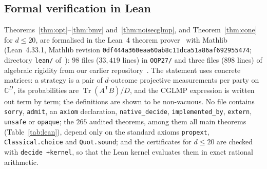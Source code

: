 \documentclass[11pt]{article}
\theoremstyle{remark}
\numberwithin{equation}{section}
\newcommand{\C}{\mathbb{C}}
\newcommand{\Tr}{\operatorname{Tr}}
\begin{document}
\subsection{Formal verification in Lean}\label{subsec:lean}
Theorems~\ref{thm:opt}--\ref{thm:bmv} and~\ref{thm:noisecglmp}, and Theorem~\ref{thm:cone} for $d\le20$, are formalised
in the Lean~4 theorem prover~\cite{Lean} with Mathlib~\cite{Mathlib} (Lean~4.33.1, Mathlib revision
\texttt{0df444a360eaa60ab8c11dca51a86af692955474}; directory \texttt{lean/} of~\cite{repo}): $98$ files ($33{,}419$ lines)
in \texttt{OQP27/} and three files ($898$ lines) of algebraic rigidity from our earlier repository~\cite{repoCGLMP}. The
statement uses concrete matrices: a strategy is a pair of $d$-outcome projective measurements per party on $\C^D$, its
probabilities are $\Tr(A^{\mathsf T}B)/D$, and the CGLMP expression is written out term by term; the definitions are
shown to be non-vacuous. No file contains \texttt{sorry}, \texttt{admit}, an \texttt{axiom} declaration,
\texttt{native\_decide}, \texttt{implemented\_by}, \texttt{extern}, \texttt{unsafe} or \texttt{opaque}; the $265$
audited theorems, among them all main theorems (Table~\ref{tab:lean}), depend only on the standard axioms
\texttt{propext}, \texttt{Classical.choice} and \texttt{Quot.sound}; and the certificates for $d\le20$ are checked with
\texttt{decide +kernel}, so that the Lean kernel evaluates them in exact rational arithmetic.
\end{document}
